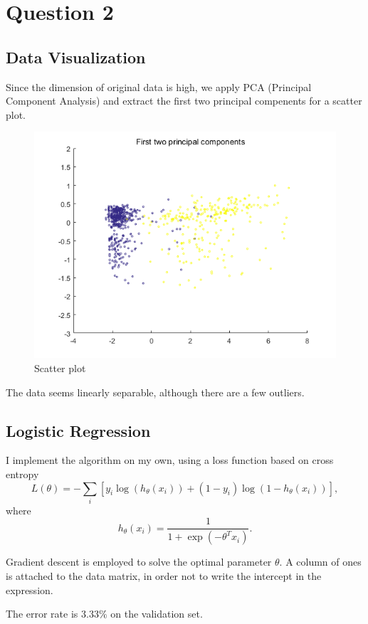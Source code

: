 \documentclass{article}
\begin{document}
\section*{Question 2}
{
    \subsection*{Data Visualization}
    {
        Since the dimension of original data is high, we apply PCA (Principal Component Analysis) and extract the first two principal compenents for a scatter plot. 

        \begin{figure}[H]
            \centering
            \includegraphics[width = 0.8\linewidth]{pca.png}
            \caption{Scatter plot}
        \end{figure}

        The data seems linearly separable, although there are a few outliers.
    }

    \subsection*{Logistic Regression}
    {
        I implement the algorithm on my own, using a loss function based on cross entropy
        $$L(\theta) = - \sum_{i} {\left[ y_i \log{(h_\theta (x_i))} + (1 - y_i) \log{(1 - h_\theta (x_i))}\right]},$$
        where $$h_\theta (x_i) = \frac{1}{1 + \exp{(- \theta^T x_i)}}.$$

        Gradient descent is employed to solve the optimal parameter $\theta$. A column of ones is attached to the data matrix, in order not to write the intercept in the expression.

        The error rate is $3.33\%$ on the validation set.

}}
\end{document}
